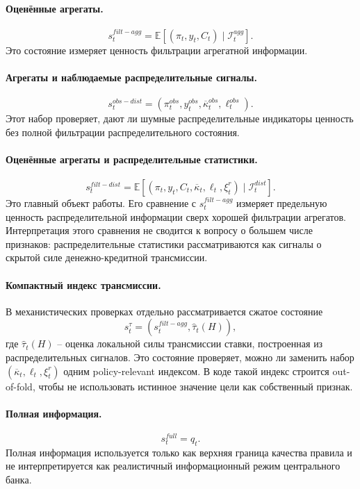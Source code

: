 \paragraph{Оценённые агрегаты.}
\[
s_t^{filt-agg}
=
\mathbb E
\left[
(\pi_t,y_t,C_t)
\mid
\mathcal I_t^{agg}
\right].
\]
Это состояние измеряет ценность фильтрации агрегатной информации.

\paragraph{Агрегаты и наблюдаемые распределительные сигналы.}
\[
s_t^{obs-dist}
=
\left(
\pi_t^{obs},
y_t^{obs},
\overline{\kappa}_t^{obs},
\ell_t^{obs}
\right).
\]
Этот набор проверяет, дают ли шумные распределительные индикаторы ценность без полной фильтрации распределительного состояния.

\paragraph{Оценённые агрегаты и распределительные статистики.}
\[
s_t^{filt-dist}
=
\mathbb E
\left[
(\pi_t,y_t,C_t,\overline{\kappa}_t,\ell_t,\xi_t^r)
\mid
\mathcal I_t^{dist}
\right].
\]
Это главный объект работы. Его сравнение с \(s_t^{filt-agg}\) измеряет предельную ценность
распределительной информации сверх хорошей фильтрации агрегатов. Интерпретация этого сравнения не
сводится к вопросу о большем числе признаков: распределительные статистики рассматриваются как
сигналы о скрытой силе денежно-кредитной трансмиссии.

\paragraph{Компактный индекс трансмиссии.}
В механистических проверках отдельно рассматривается сжатое состояние
\[
s_t^\tau
=
\left(
s_t^{filt-agg},
\widehat\tau_t(H)
\right),
\]
где \(\widehat\tau_t(H)\) -- оценка локальной силы трансмиссии ставки, построенная из
распределительных сигналов. Это состояние проверяет, можно ли заменить набор
\((\overline{\kappa}_t,\ell_t,\xi_t^r)\) одним policy-relevant индексом. В коде такой индекс
строится out-of-fold, чтобы не использовать истинное значение цели как собственный признак.

\paragraph{Полная информация.}
\[
s_t^{full}=q_t.
\]
Полная информация используется только как верхняя граница качества правила и не интерпретируется как реалистичный информационный режим центрального банка.
